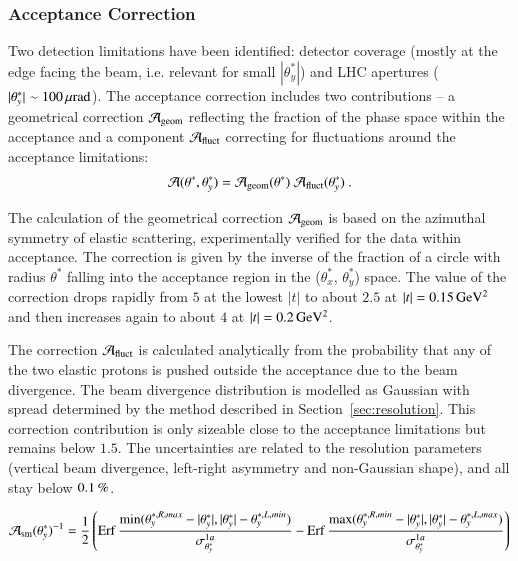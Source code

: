 
\subsubsection{Acceptance Correction}
\label{sec:acc corr}

Two detection limitations have been identified: detector coverage (mostly at the edge facing the beam, i.e. relevant for small $|\theta_y^*|$) and LHC apertures ($|\theta_y^*| \sim 100\,{\rm \mu rad}$). The acceptance correction includes two contributions -- a geometrical correction ${\cal A}_{\rm geom}$ reflecting the fraction of the phase space within the acceptance and a component ${\cal A}_{\rm fluct}$ correcting for fluctuations around the acceptance limitations:
\begin{equation}
{\cal A}(\theta^*, \theta_y^*) = {\cal A}_{\rm geom}(\theta^*)\ {\cal A}_{\rm fluct}(\theta_y^*)\ .
\end{equation}

The calculation of the geometrical correction ${\cal A}_{\rm geom}$ is based on the azimuthal symmetry of elastic scattering, experimentally verified for the data within acceptance. The correction is given by the inverse of the fraction of a circle with radius $\theta^*$ falling into the acceptance region in the ($\theta_x^*$, $\theta_y^*$) space. The value of the correction drops rapidly from $5$ at the lowest $|t|$ to about $2.5$ at $|t| = 0.15\,{\rm GeV^2}$ and then increases again to about $4$ at $|t| = 0.2\,{\rm GeV^2}$.

The correction ${\cal A}_{\rm fluct}$ is calculated analytically from the probability that any of the two elastic protons is pushed outside the acceptance due to the beam divergence. The beam divergence distribution is modelled as Gaussian with spread determined by the method described in Section~\ref{sec:resolution}. This correction contribution is only sizeable close to the acceptance limitations but remains below $1.5$. The uncertainties are related to the resolution parameters (vertical beam divergence, left-right asymmetry and non-Gaussian shape), and all stay below $0.1\,{\rm \%}$.


\iffalse
\begin{equation}
\label{acceptance}
{\cal A_{\rm sm}}(\theta_y^*)^{-1} = {1\over 2} \left(
	\mathop{\rm Erf} {\min(\theta_y^{*,R,max} - |\theta_y^*|, |\theta_y^*| - \theta_y^{*,L,min})\over \sigma^{1a}_{\theta_y^*}}
	- \mathop{\rm Erf} {\max(\theta_y^{*,R,min} - |\theta_y^*|, |\theta_y^*| - \theta_y^{*,L,max})\over \sigma^{1a}_{\theta_y^*}}
\right)
\end{equation}

